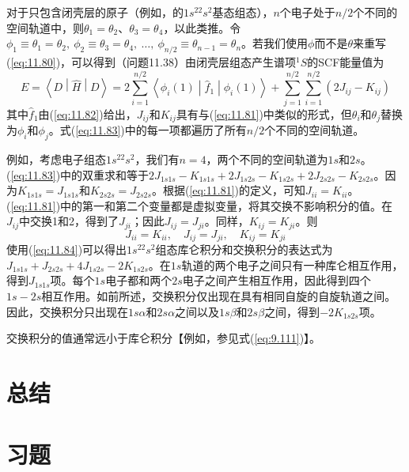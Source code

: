     对于只包含闭壳层的原子（例如，的$1s^22s^2$基态组态），$n$个电子处于$n/2$个不同的空间轨道中，则$\theta_1 = \theta_2$、$\theta_3 = \theta_4$，以此类推。令$\phi_1 \equiv \theta_1 = \theta_2,\:\phi_2 \equiv \theta_3 = \theta_4,\:\ldots,\:\phi_{n/2} \equiv \theta_{n-1} = \theta_n$。若我们使用$\phi$而不是$\theta$来重写(\ref{eq:11.80})，可以得到（问题11.38）由闭壳层组态产生谱项$^1S$的SCF能量值为
    \begin{equation}
        E = \left\langle D \middle| \hat{H} \middle| D \right\rangle = 2\sum_{i=1}^{n/2} \left\langle \phi_i \left( 1 \right) \middle| \hat{f}_1 \middle| \phi_i \left( 1 \right) \right\rangle + \sum_{j=1}^{n/2} \sum_{i=1}^{n/2} \left( 2J_{ij} - K_{ij} \right)
        \label{eq:11.83}
    \end{equation}
    其中$\hat{f}_1$由(\ref{eq:11.82})给出，$J_{ij}$和$K_{ij}$具有与(\ref{eq:11.81})中类似的形式，但$\theta_i$和$\theta_j$替换为$\phi_i$和$\phi_j$。式(\ref{eq:11.83})中的每一项都遍历了所有$n/2$个不同的空间轨道。

    例如，考虑电子组态$1s^22s^2$，我们有$n=4$，两个不同的空间轨道为$1s$和$2s$。(\ref{eq:11.83})中的双重求和等于$2J_{1s1s} - K_{1s1s} + 2J_{1s2s} - K_{1s2s} + 2J_{2s2s} - K_{2s2s}$。因为$K_{1s1s} = J_{1s1s}$和$K_{2s2s} = J_{2s2s}$。根据(\ref{eq:11.81})的定义，可知$J_{ii} = K_{ii}$。(\ref{eq:11.81})中的第一和第二个变量都是虚拟变量，将其交换不影响积分的值。在$J_{ij}$中交换1和2，得到了$J_{ji}$；因此$J_{ij} = J_{ji}$。同样，$K_{ij} = K_{ji}$。则
    \begin{equation}
        J_{ii} = K_{ii}, \quad J_{ij} = J_{ji}, \quad K_{ij} = K_{ji}
        \label{eq:11.84}
    \end{equation}
    使用(\ref{eq:11.84})可以得出$1s^22s^2$组态库仑积分和交换积分的表达式为$J_{1s1s} + J_{2s2s} + 4J_{1s2s} - 2K_{1s2s}$。在$1s$轨道的两个电子之间只有一种库仑相互作用，得到$J_{1s1s}$项。每个$1s$电子都和两个$2s$电子之间产生相互作用，因此得到四个$1s-2s$相互作用。如前所述，交换积分仅出现在具有相同自旋的自旋轨道之间。因此，交换积分只出现在$1s\alpha$和$2s\alpha$之间以及$1s\beta$和$2s\beta$之间，得到$-2K_{1s2s}$项。

    交换积分的值通常远小于库仑积分【例如，参见式(\ref{eq:9.111})】。

\section*{总结}

\section*{习题}
